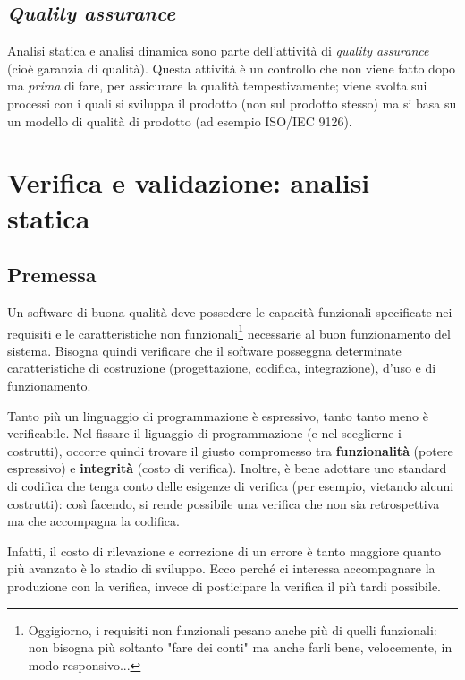 \documentclass[a4paper]{article}
\begin{document}
		
	\subsection{\emph{Quality assurance}}

		
Analisi statica e analisi dinamica sono parte dell'attività di \emph{quality assurance} (cioè garanzia di qualità). Questa attività è un controllo che non viene fatto dopo ma \emph{prima} di fare, per assicurare la qualità tempestivamente; viene svolta sui processi con i quali si sviluppa il prodotto (non sul prodotto stesso) ma si basa su un modello di qualità di prodotto (ad esempio ISO/IEC 9126).
	


		
	\section{Verifica e validazione: analisi statica}


		
	\subsection{Premessa}

		
Un software di buona qualità deve possedere le capacità funzionali specificate nei requisiti e le caratteristiche non funzionali\footnote{Oggigiorno, i requisiti non funzionali pesano anche più di quelli funzionali: non bisogna più soltanto "fare dei conti" ma anche farli bene, velocemente, in modo responsivo...} necessarie al buon funzionamento del sistema. Bisogna quindi verificare che il software posseggna determinate caratteristiche di costruzione (progettazione, codifica, integrazione), d'uso e di funzionamento.
		
Tanto più un linguaggio di programmazione è espressivo, tanto tanto meno è verificabile. Nel fissare il liguaggio di programmazione (e nel sceglierne i costrutti), occorre quindi trovare il giusto compromesso tra \textbf{funzionalità} (potere espressivo) e \textbf{integrità} (costo di verifica). Inoltre, è bene adottare uno standard di codifica che tenga conto delle esigenze di verifica (per esempio, vietando alcuni costrutti): così facendo, si rende possibile una verifica che non sia retrospettiva ma che accompagna la codifica.
		
Infatti, il costo di rilevazione e correzione di un errore è tanto maggiore quanto più avanzato è lo stadio di sviluppo. Ecco perché ci interessa accompagnare la produzione con la verifica, invece di posticipare la verifica il più tardi possibile.
\end{document}
